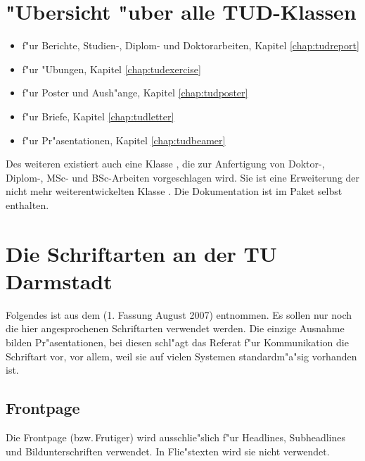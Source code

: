 \documentclass[twoside,colorback,accentcolor=tud4c,11pt]{tudreport}
\begin{document}
  \section{"Ubersicht "uber alle TUD-Klassen}

  \begin{itemize}\itemsep-0.5ex
    \item {} f"ur Berichte, Studien-, Diplom- und Doktorarbeiten,
    Kapitel \ref{chap:tudreport}
    \item {} f"ur "Ubungen, Kapitel \ref{chap:tudexercise}
    \item {} f"ur Poster und Aush"ange, Kapitel \ref{chap:tudposter}
    \item {} f"ur Briefe, Kapitel \ref{chap:tudletter}
    \item {} f"ur Pr"asentationen, Kapitel \ref{chap:tudbeamer}
  \end{itemize}

  Des weiteren existiert auch eine Klasse , die zur
  Anfertigung von Doktor-, Diplom-, MSc- und  BSc-Arbeiten vorgeschlagen
  wird. Sie ist eine Erweiterung der nicht mehr weiterentwickelten Klasse
  . Die Dokumentation ist im Paket selbst enthalten.

  \section{Die Schriftarten an der TU Darmstadt}

    Folgendes ist aus dem  (1. Fassung August 2007)
    entnommen. Es sollen nur noch die hier angesprochenen Schriftarten verwendet
    werden. Die einzige Ausnahme bilden Pr"asentationen, bei diesen schl"agt
    das Referat f"ur Kommunikation die Schriftart  vor,
    vor allem, weil sie auf vielen Systemen standardm"a"sig vorhanden ist.
 
  \subsection{Frontpage}
    Die Frontpage (bzw.\,Frutiger) wird ausschlie"slich f"ur Headlines, Subheadlines und Bildunterschriften
    verwendet. In Flie"stexten wird sie nicht verwendet.
\end{document}
